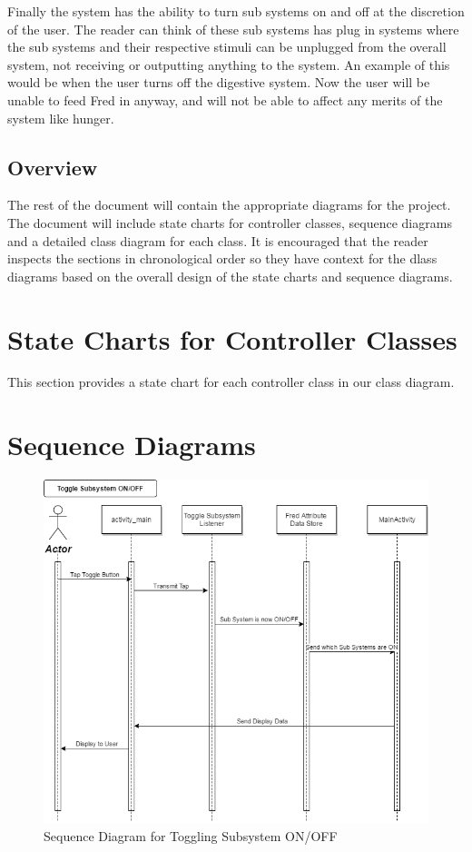\documentclass[]{article}
\begin{document}
Finally the system has the ability to turn sub systems on and off at the discretion of the user. The reader can think of these sub systems has plug in systems where the sub systems and their respective stimuli can be unplugged from the overall system, not receiving or outputting anything to the system. An example of this would be when the user turns off the digestive system. Now the user will be unable to feed Fred in anyway, and will not be able to affect any merits of the system like hunger.

\subsection{Overview}
\label{sub:overview}
The rest of the document will contain the appropriate diagrams for the project. The document will include state charts for controller classes, sequence diagrams and a detailed class diagram for each class. It is encouraged that the reader inspects the sections in chronological order so they have context for the dlass diagrams based on the overall design of the state charts and sequence diagrams.



\section{State Charts for Controller Classes}
\label{sec:state_charts_for_controller_classes}
This section provides a state chart for each controller class in our class diagram.

\section{Sequence Diagrams}
\label{sec:sequence_diagrams}
\begin{figure}[H]
	\centering
	\includegraphics[width=0.7\linewidth]{../Resources/Toggle_Subsystem_Sequence_Diagram.png}
	\caption{Sequence Diagram for Toggling Subsystem ON/OFF}
\end{figure}
\end{document}
